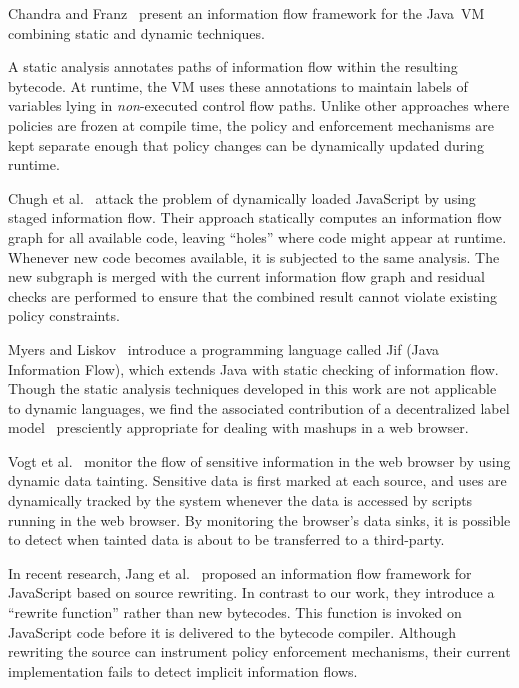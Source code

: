 \documentclass{llncs}
\begin{document}
Chandra and Franz~\cite{10.1109/ACSAC.2007.37} present an information flow framework for the Java~VM combining static and dynamic techniques.

A static analysis annotates paths of information flow within the resulting bytecode.
At runtime, the VM uses these annotations to maintain labels of variables lying in \emph{non}-executed control flow paths.
Unlike other approaches where policies are frozen at compile time, the policy and enforcement mechanisms are kept separate enough that policy changes can be dynamically updated during runtime.

Chugh et al.~\cite{1542483} attack the problem of dynamically loaded JavaScript by using staged information flow.
Their approach statically computes an information flow graph for all available code, leaving ``holes'' where code might appear at runtime.
Whenever new code becomes available, it is subjected to the same analysis.
The new subgraph is merged with the current information flow graph and residual checks are performed to ensure that the combined result cannot violate existing policy constraints.

Myers and Liskov~\cite{363526} introduce a programming language called Jif (Java Information Flow), which extends Java with static checking of information flow.
Though the static analysis techniques developed in this work are not applicable to dynamic languages, we find the associated contribution of a decentralized label model~\cite{363526} presciently appropriate for dealing with mashups in a web browser.

Vogt et al.~\cite{Vogt_CrossSiteScripting_2007} monitor the flow of sensitive information in the web browser by using dynamic data tainting.
Sensitive data is first marked at each source, and uses are dynamically tracked by the system whenever the data is accessed by scripts running in the web browser.
By monitoring the browser's data sinks, it is possible to detect when tainted data is about to be transferred to a third-party.

In recent research, Jang et al.~\cite{1866339} proposed an information flow framework for JavaScript based on source rewriting.
In contrast to our work, they introduce a ``rewrite function'' rather than new bytecodes.
This function is invoked on JavaScript code before it is delivered to the bytecode compiler.
Although rewriting the source can instrument policy enforcement mechanisms, their current implementation fails to detect implicit information flows.
\end{document}
